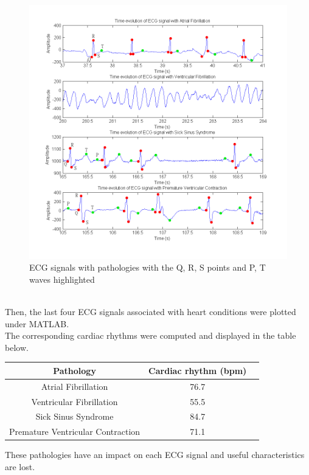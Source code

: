 \documentclass[11pt]{article}
\begin{document}
		\begin{figure}[ht]
			\centering
			\includegraphics[scale=0.65]{images/Q312.png}
			\caption{ECG signals with pathologies with the Q, R, S points and P, T waves highlighted}
			\label{Q312}
		\end{figure}
		\\
		Then, the last four ECG signals associated with heart conditions were plotted under MATLAB.\\
		The corresponding cardiac rhythms were computed and displayed in the table below.\\ 
		\begin{center}
			\begin{tabular}{|c|c|c|}
				\hline
				\textbf{Pathology} & \textbf{Cardiac rhythm (bpm)} \\
				\hline
				Atrial Fibrillation & 76.7 \\ 
				\hline
				Ventricular Fibrillation & 55.5 \\
				\hline
				Sick Sinus Syndrome & 84.7 \\
				\hline
				Premature Ventricular Contraction & 71.1 \\
				\hline
			\end{tabular}
		\end{center}
		\vspace{0.3in}
		These pathologies have an impact on each ECG signal and useful characteristics are lost.\\
\end{document}
